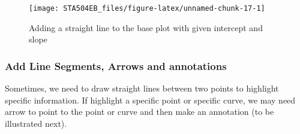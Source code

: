 \documentclass[
]{book}
\begin{document}
\begin{figure}

{\centering \texttt{[image: STA504EB\_files/figure-latex/unnamed-chunk-17-1]} 

}

\caption{Adding a straight line to the base plot with given intercept and slope}\label{fig:unnamed-chunk-17}
\end{figure}

\hypertarget{add-line-segments-arrows-and-annotations}{%
\subsubsection{Add Line Segments, Arrows and annotations}\label{add-line-segments-arrows-and-annotations}}

Sometimes, we need to draw straight lines between two points to highlight specific information. If highlight a specific point or specific curve, we may need arrow to point to the point or curve and then make an annotation (to be illustrated next).
\end{document}
